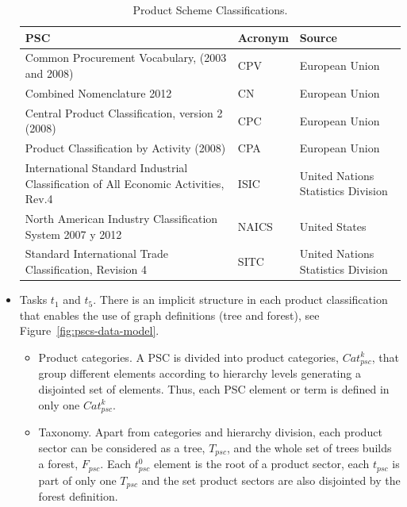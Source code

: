 \begin{itemize}
\begin{table}[!ht]
\renewcommand{\arraystretch}{1.3}
\begin{center}
\begin{tabular}[c]{|p{6cm}|l|p{6cm}|} 
\hline
  \textbf{PSC} &  \textbf{Acronym} & \textbf{Source} \\\hline
  Common Procurement Vocabulary, (2003 and 2008) & CPV & European Union \\ \hline
  Combined Nomenclature 2012 & CN & European Union \\ \hline
  Central Product Classification, version 2 (2008) & CPC & European Union \\ \hline
  Product Classification by Activity (2008) & CPA & European Union \\ \hline
  International Standard Industrial Classification of All Economic Activities, Rev.4 & ISIC & United Nations Statistics Division \\ \hline
  North American Industry Classification System 2007 y 2012 & NAICS & United States \\ \hline
  Standard International Trade Classification, Revision 4 & SITC & United Nations Statistics Division \\ \hline
\hline
\end{tabular}
\caption{Product Scheme Classifications.}\label{table:pscs-ld}
  \end{center}
\end{table} 

 \item Tasks $t_1$ and $t_5$. There is an implicit structure in each product classification 
 that enables the use of graph definitions (tree and forest), see Figure~\ref{fig:pscs-data-model}.
 \begin{itemize}
  \item Product categories. A PSC is divided into product categories, $Cat^k_{psc}$, that group different elements according to 
  hierarchy levels generating a disjointed set of elements. Thus, each PSC element or term is defined in only one $Cat^k_{psc}$.
  \item Taxonomy. Apart from categories and hierarchy division, each product sector can be considered as a tree, $T_{psc}$, 
  and the whole set of trees builds a forest, $F_{psc}$. Each $t^0_{psc}$ element is the root of a product sector, each $t_{psc}$ 
  is part of only one $T_{psc}$ and the set product sectors are also disjointed by the forest definition.
 \end{itemize}
 

\end{itemize}
